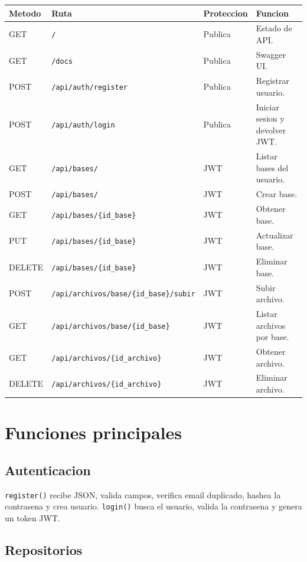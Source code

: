 \documentclass[12pt,a4paper]{article}
\begin{document}
\begin{longtable}{|p{2cm}|p{6cm}|p{3cm}|p{5cm}|}
\hline
\textbf{Metodo} & \textbf{Ruta} & \textbf{Proteccion} & \textbf{Funcion} \\
\hline
GET & \texttt{/} & Publica & Estado de API. \\
\hline
GET & \texttt{/docs} & Publica & Swagger UI. \\
\hline
POST & \texttt{/api/auth/register} & Publica & Registrar usuario. \\
\hline
POST & \texttt{/api/auth/login} & Publica & Iniciar sesion y devolver JWT. \\
\hline
GET & \texttt{/api/bases/} & JWT & Listar bases del usuario. \\
\hline
POST & \texttt{/api/bases/} & JWT & Crear base. \\
\hline
GET & \texttt{/api/bases/\{id\_base\}} & JWT & Obtener base. \\
\hline
PUT & \texttt{/api/bases/\{id\_base\}} & JWT & Actualizar base. \\
\hline
DELETE & \texttt{/api/bases/\{id\_base\}} & JWT & Eliminar base. \\
\hline
POST & \texttt{/api/archivos/base/\{id\_base\}/subir} & JWT & Subir archivo. \\
\hline
GET & \texttt{/api/archivos/base/\{id\_base\}} & JWT & Listar archivos por base. \\
\hline
GET & \texttt{/api/archivos/\{id\_archivo\}} & JWT & Obtener archivo. \\
\hline
DELETE & \texttt{/api/archivos/\{id\_archivo\}} & JWT & Eliminar archivo. \\
\hline
\end{longtable}

\section{Funciones principales}

\subsection{Autenticacion}

\texttt{register()} recibe JSON, valida campos, verifica email duplicado, hashea la contrasena y crea usuario. \texttt{login()} busca el usuario, valida la contrasena y genera un token JWT.

\subsection{Repositorios}
\end{document}
